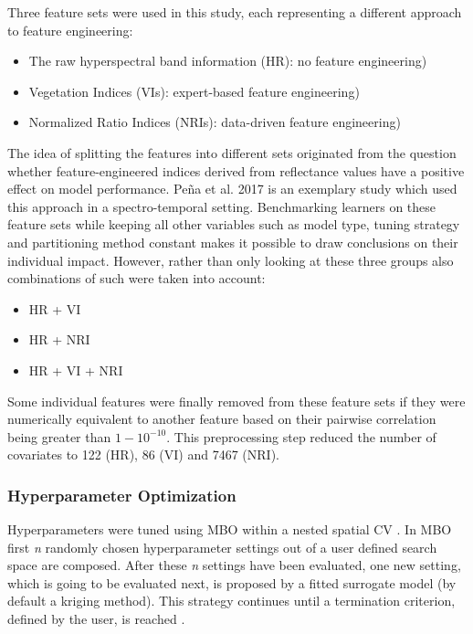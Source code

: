 \documentclass[final]{IEEEtran}
\begin{document}
Three feature sets were used in this study, each representing a different approach to feature engineering:

\begin{itemize}
	\item The raw hyperspectral band information (HR): no feature engineering) %
	\item Vegetation Indices (\ac{VI}s): expert-based feature engineering)
	\item Normalized Ratio Indices (\ac{NRI}s): data-driven feature engineering)
\end{itemize}

The idea of splitting the features into different sets originated from the question whether feature-engineered indices derived from reflectance values have a positive effect on model performance.
Peña et al. 2017 \cite{pena2017} is an exemplary study which used this approach in a spectro-temporal setting.
Benchmarking learners on these feature sets while keeping all other variables such as model type, tuning strategy and partitioning method constant makes it possible to draw conclusions on their individual impact.
However, rather than only looking at these three groups also combinations of such were taken into account:

\begin{itemize}
	\item HR + VI %
	\item HR + NRI
	\item HR + VI + NRI
\end{itemize}

Some individual features were finally removed from these feature sets if they were numerically equivalent to another feature based on their pairwise correlation being greater than $1 - 10^{-10}$.
This preprocessing step reduced the number of covariates to 122 (HR), 86 (VI) and 7467 (NRI).

\subsubsection{Hyperparameter Optimization}

Hyperparameters were tuned using \ac{MBO} within a nested spatial \ac{CV} \cite{mlrmbo, binder2020, schratz2019}.
In MBO first \textit{n} randomly chosen hyperparameter settings out of a user defined search space are composed.
After these \textit{n} settings have been evaluated, one new setting, which is going to be evaluated next, is proposed by a fitted surrogate model (by default a kriging method).
This strategy continues until a termination criterion, defined by the user, is reached \cite{hutter2011, jones1998}.
\end{document}
